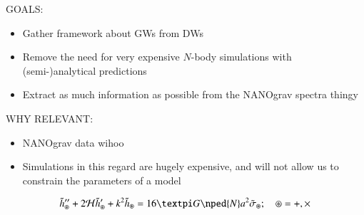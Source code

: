 


\begin{bullets}
    \item GOALS: \begin{itemize}
        \item Gather framework about GWs from DWs
        \item Remove the need for very expensive $N$-body simulations with (semi-)analytical predictions
        \item Extract as much information as possible from the NANOgrav spectra thingy
    \end{itemize}
    \item WHY RELEVANT: \begin{itemize}
        \item NANOgrav data wihoo
        \item Simulations in this regard are hugely expensive, and will not allow us to constrain the parameters of a model
    \end{itemize}
\end{bullets}














\begin{equation}
    \tilde{h}^{\prime \prime}_\circledast + 2\mathcal{H}\tilde{h}^{\prime}_\circledast + k^2 \tilde{h}_\circledast = 16\ppi G\nped{N} a^2 \tilde{\sigma}_\circledast; \quad \circledast = +, \times
\end{equation}





